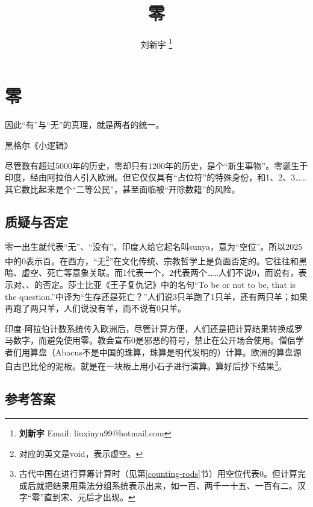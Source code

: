 \documentclass[b5paper]{ctexart}
\begin{document}
\title{零}

\author{刘新宇
\thanks{{\bfseries 刘新宇} \newline
  Email: liuxinyu99@hotmail.com \newline}
  }

\maketitle
\fi


\ifx\wholebook\relax
\chapter{零}
\fi

\epigraph{因此“有”与“无”的真理，就是两者的统一。}{黑格尔《小逻辑》}

尽管数有超过5000年的历史，零却只有1200年的历史，是个“新生事物”。零诞生于印度，经由阿拉伯人引入欧洲。但它仅仅具有“占位符”的特殊身份，和1、2、3……其它数比起来是个“二等公民”，甚至面临被“开除数籍”的风险。

\section{质疑与否定}
零一出生就代表“无”、“没有”。印度人给它起名叫sunya，意为“空位”。所以2025中的0表示百。在西方，“无\footnote{对应的英文是void，表示虚空。}”在文化传统、宗教哲学上是负面否定的。它往往和黑暗、虚空、死亡等意象关联。而1代表一个，2代表两个……人们不说0，而说有，表示对、、的否定。莎士比亚《王子复仇记》中的名句“To be or not to be, that is the question.”中译为“生存还是死亡？”人们说3只羊跑了1只羊，还有两只羊；如果再跑了两只羊，人们说没有羊，而不说有0只羊。

印度-阿拉伯计数系统传入欧洲后，尽管计算方便，人们还是把计算结果转换成罗马数字，而避免使用零。教会宣布0是邪恶的符号，禁止在公开场合使用。僧侣学者们用算盘（Abacus不是中国的珠算，珠算是明代发明的）计算。欧洲的算盘源自古巴比伦的泥板。就是在一块板上用小石子进行演算。算好后抄下结果\footnote{古代中国在进行算筹计算时（见第\ref{counting-rods}节）用空位代表0。但计算完成后就把结果用乘法分组系统表示出来，如一百、两千一十五、一百有二。汉字“零”直到宋、元后才出现。}。



\ifx\wholebook\relax \else
\section{参考答案}
\shipoutAnswer


\begin{thebibliography}{99}

\end{thebibliography}

\expandafter\enddocument
\fi
\end{document}
